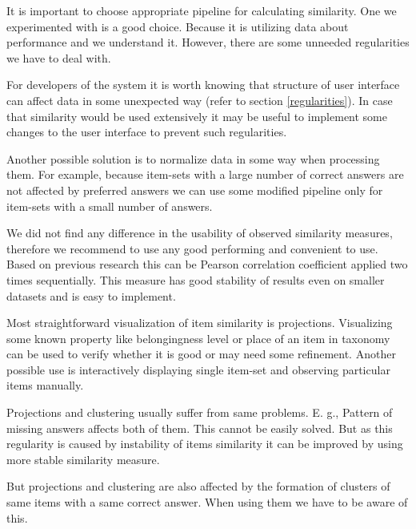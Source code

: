 \documentclass[
  digital, %
  table,   %
  nolof,     %
  nolot,     %
  nocover,
  color,
  final, %
]{fithesis3}
\begin{document}

It is important to choose appropriate pipeline for calculating similarity. One we experimented with is a good choice. Because it is utilizing data about performance and we understand it. However, there are some unneeded regularities we have to deal with.

For developers of the system it is worth knowing that structure of user interface can affect data in some unexpected way (refer to section \ref{regularities}). In case that similarity would be used extensively it may be useful to implement some changes to the user interface to prevent such regularities.


Another possible solution is to normalize data in some way when processing them. For example, because item-sets with a large number of correct answers are not affected by preferred answers we can use some modified pipeline only for item-sets with a small number of answers.


We did not find any difference in the usability of observed similarity measures, therefore we recommend to use any good performing and convenient to use. Based on previous research this can be Pearson correlation coefficient applied two times sequentially. This measure has good stability of results even on smaller datasets and is easy to implement.


Most straightforward visualization of item similarity is projections. Visualizing some known property like belongingness level or place of an item in taxonomy can be used to verify whether it is good or may need some refinement. Another possible use is interactively displaying single item-set and observing particular items manually.


Projections and clustering usually suffer from same problems. E. g., Pattern of missing answers affects both of them. This cannot be easily solved. But as this regularity is caused by instability of items similarity it can be improved by using more stable similarity measure.

But projections and clustering are also affected by the formation of clusters of same items with a same correct answer. When using them we have to be aware of this.

\end{document}

